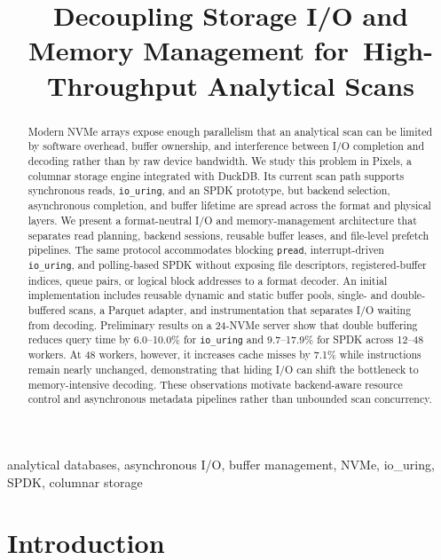 \documentclass[conference]{IEEEtran}
\begin{document}
\title{Decoupling Storage I/O and Memory Management for\
High-Throughput Analytical Scans}

\author{\IEEEauthorblockN{Anonymous Authors}
}

\maketitle

\begin{abstract}
Modern NVMe arrays expose enough parallelism that an analytical scan can be
limited by software overhead, buffer ownership, and interference between I/O
completion and decoding rather than by raw device bandwidth.  We study this
problem in Pixels, a columnar storage engine integrated with DuckDB.  Its
current scan path supports synchronous reads, \texttt{io\_uring}, and an SPDK
prototype, but backend selection, asynchronous completion, and buffer lifetime
are spread across the format and physical layers.  We present a format-neutral
I/O and memory-management architecture that separates read planning, backend
sessions, reusable buffer leases, and file-level prefetch pipelines.  The same
protocol accommodates blocking \texttt{pread}, interrupt-driven
\texttt{io\_uring}, and polling-based SPDK without exposing file descriptors,
registered-buffer indices, queue pairs, or logical block addresses to a format
decoder.  An initial implementation includes reusable dynamic and static
buffer pools, single- and double-buffered scans, a Parquet adapter, and
instrumentation that separates I/O waiting from decoding.  Preliminary results
on a 24-NVMe server show that double buffering reduces query time by
6.0--10.0\% for \texttt{io\_uring} and 9.7--17.9\% for SPDK across 12--48
workers.  At 48 workers, however, it increases cache misses by 7.1\% while
instructions remain nearly unchanged, demonstrating that hiding I/O can shift
the bottleneck to memory-intensive decoding.  These observations motivate
backend-aware resource control and asynchronous metadata pipelines rather than
unbounded scan concurrency.
\end{abstract}

\begin{IEEEkeywords}
analytical databases, asynchronous I/O, buffer management, NVMe, io\_uring,
SPDK, columnar storage
\end{IEEEkeywords}

\section{Introduction}
\end{document}
